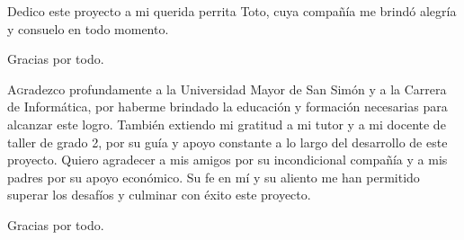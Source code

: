 

\begin{dedication}
	\setlength{\parskip}{\baselineskip}
	\lettrine[lraise=-0.1, lines=2, loversize=0.25]{D}{}edico este proyecto a mi querida perrita Toto, cuya compañía me brindó alegría y consuelo en todo momento.	\begin{flushright}
		Gracias por todo.
	\end{flushright}
\end{dedication}

\begin{acknowledgements}
	\setlength{\parskip}{\baselineskip}
	\lettrine[lraise=-0.1, lines=2, loversize=0.25]{A}gradezco profundamente a la Universidad Mayor de San Simón y a la Carrera de Informática, por haberme brindado la educación y formación necesarias para alcanzar este logro. También extiendo mi gratitud a mi tutor y a mi docente de taller de grado 2, por su guía y apoyo constante a lo largo del desarrollo de este proyecto. 
	Quiero agradecer a mis amigos por su incondicional compañía y a mis padres por su apoyo económico. Su fe en mí y su aliento me han permitido superar los desafíos y culminar con éxito este proyecto.
	\begin{flushright}
		Gracias por todo.
	\end{flushright}
\end{acknowledgements}
